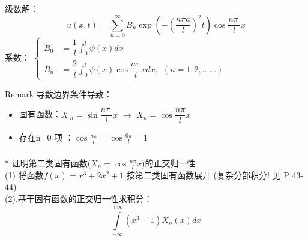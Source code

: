     
\begin{frame}
        级数解：
        \begin{equation*}
            u(x,t)=\sum\limits_{n=0}^{\infty } B_n  \exp(-(\frac{n\pi a}{l})^2 t) \cos \frac{n\pi~}{l} x
        \end{equation*}
        系数：
        $\displaystyle  \begin{cases}
            B_0&= \dfrac{1}{l} \int_{0}^{l} \psi(x) dx \\
            B_n&= \dfrac{2}{l} \int_{0}^{l} \psi(x) \cos \dfrac{n\pi}{l} xdx ,~~ (n=1,2,......)
        \end{cases}$ \\	 \vspace*{0.6em}
        \begin{block} {Remark }
            导数边界条件导致：
            \begin{itemize}
                \item  固有函数：$X~_n=\sin \dfrac{n\pi~}{l} x$ $\to$ 	$X_n=\cos \dfrac{n\pi}{l} x$
                \item 	存在n=0 项 ：$\cos \frac{n\pi}{l} = \cos \frac{0\pi}{l} =1$
            \end{itemize}
        \end{block}
\end{frame}

\begin{frame}
      \frametitle{}
       * 证明第二类固有函数($X_n=\cos \frac{n\pi}{l} x$)的正交归一性 \\
      (1) 将函数$f(x)=x^3+2x^2 +1$ 按第二类固有函数展开 (复杂分部积分! 见 P 43-44)\\
      (2).基于固有函数的正交归一性求积分：
    \[ \int\limits_{-\infty}^{+\infty} (x^3 +1) X_n(x) d x \]
      
\end{frame}

